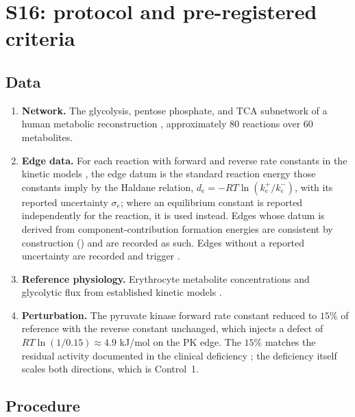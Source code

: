 \documentclass[11pt,a4paper]{article}
\theoremstyle{definition}
\theoremstyle{remark}
\begin{document}
\section*{S16: protocol and pre-registered criteria}

\subsection*{Data}

\begin{enumerate}[leftmargin=1.5em,itemsep=2pt]
\item \textbf{Network.} The glycolysis, pentose phosphate, and TCA
subnetwork of a human metabolic reconstruction
\citep{brunk2018}, approximately $80$ reactions over $60$ metabolites.
\item \textbf{Edge data.} For each reaction with forward and reverse rate
constants in the kinetic models \citep{rapoport1975,mulquiney1999}, the
edge datum is the standard reaction energy those constants imply by the
Haldane relation, $d_e=-RT\ln(k_e^{+}/k_e^{-})$, with its reported
uncertainty $\sigma_e$; where an equilibrium constant is reported
independently for the reaction, it is used instead. Edges whose datum is
derived from component-contribution formation energies
\citep{noor2013,flamholz2012} are consistent by construction
() and are recorded as such. Edges without a
reported uncertainty are recorded and trigger .
\item \textbf{Reference physiology.} Erythrocyte metabolite
concentrations and glycolytic flux from established kinetic models
\citep{rapoport1975,mulquiney1999}.
\item \textbf{Perturbation.} The pyruvate kinase forward rate constant
reduced to $15\%$ of reference with the reverse constant unchanged,
which injects a defect of $RT\ln(1/0.15)\approx4.9$ kJ/mol on the PK
edge. The $15\%$ matches the residual activity documented in the
clinical deficiency \citep{zanella2005}; the deficiency itself scales
both directions, which is Control~1.
\end{enumerate}

\subsection*{Procedure}
\end{document}
